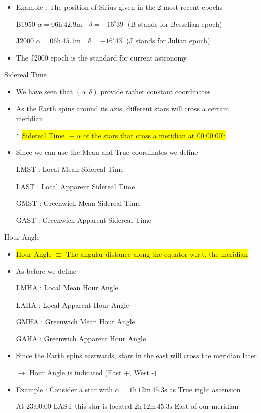 \Tr
\begin{itemize}
\item Example : The position of Sirius given in the 2 most recent epochs
\item[] B1950 $\alpha=06\text{h}\,42.9\text{m} \quad \delta=-16^{\circ} 39^{\prime}$ (B stands for Besselian epoch)
\item[] J2000 $\alpha=06\text{h}\,45.1\text{m} \quad \delta=-16^{\circ} 43^{\prime}$ (J stands for Julian epoch)
\item The J2000 epoch is the standard for current astronomy 
\end{itemize}
%
\begin{center}
{\red Sidereal Time}
\end{center}
%
\begin{itemize}
\item We have seen that $(\alpha,\delta)$ provide rather constant coordinates
\item As the Earth spins around its axis, different stars will cross a certain meridian
\item[$\ast$] \colorbox{yellow}{Sidereal Time $\equiv \alpha$ of the stars that cross a meridian at 00:00:00h}
\item Since we can use the {\blue Mean and True coordinates} we define
\item[] {\red LMST : Local Mean Sidereal Time}
\item[] {\red LAST : Local Apparent Sidereal Time}
\item[] {\red GMST : Greenwich Mean Sidereal Time}
\item[] {\red GAST : Greenwich Apparent Sidereal Time}
\end{itemize}

\Tr
\begin{center}
{\red Hour Angle}
\end{center}
%
\begin{itemize}
\item \colorbox{yellow}{Hour Angle $\equiv$ The angular distance along the equator w.r.t. the meridian}
\item As before we define
\item[] {\red LMHA : Local Mean Hour Angle}
\item[] {\red LAHA : Local Apparent Hour Angle}
\item[] {\red GMHA : Greenwich Mean Hour Angle}
\item[] {\red GAHA : Greenwich Apparent Hour Angle}
\item Since the Earth spins eastwards, stars in the east will cross the meridian later
\item[] $\rightarrow$ {\blue Hour Angle is indicated (East +, West -)}
\item Example : Consider a star with $\alpha=1\text{h}\,12\text{m}\,45.3\text{s}$ as True right ascension
\item[] At 23:00:00 LAST this star is located $2\text{h}\,12\text{m}\,45.3\text{s}$ East of our meridian
\end{itemize}

